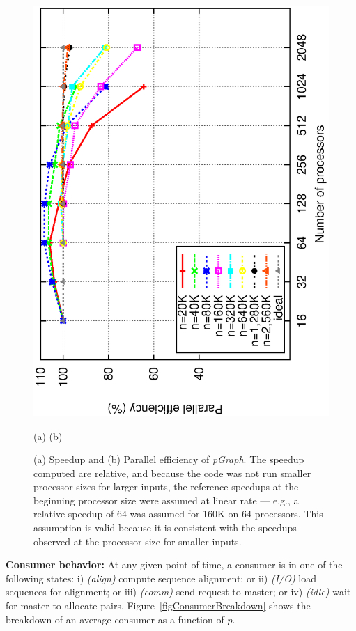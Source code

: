\documentclass[10pt,journal,letterpaper,compsoc]{IEEEtran}
\begin{document}
\begin{figure}[t]
{            \includegraphics[angle=-90, scale=0.5]{efficiency.eps}
}
\centerline{(a) \hspace*{2.6in}(b)}
\caption{
(a) Speedup and (b) Parallel efficiency of {\it pGraph}. 
The speedup computed are relative, and because the code was not run smaller processor sizes for larger inputs, the reference speedups at the beginning processor size were assumed at linear rate --- e.g., a relative speedup of 64 was assumed for 160K on 64 processors. This assumption is valid because it is consistent with the speedups observed at the processor size for smaller inputs.
}
\label{figSpeedup}
\end{figure}


{\bf Consumer behavior: } At any given point of time, a consumer is in one of the following states: i) \emph{(align)} compute sequence alignment; or ii) \emph{(I/O)} load sequences for alignment; or iii) \emph{(comm)} send request to master; or iv) \emph{(idle)} wait for master to allocate pairs. Figure~\ref{figConsumerBreakdown} shows the breakdown of an average consumer as a function of $p$. 
\end{document}
